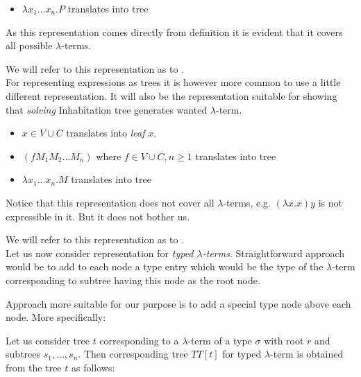 \documentclass[12pt,a4paper]{report}
\newcommand{\Lets}{Let us\xspace}
\newcommand{\lterm}{$\lambda$-term\xspace}
\newcommand{\lterms}{$\lambda$-terms\xspace}
\begin{document}
\begin{itemize}
	\item $\lambda x_1 \dots x_n . P$ translates into tree\\
\end{itemize}

As this representation comes directly from definition it is evident 
that it covers all possible \lterms.

We will refer to this representation as to \textit{\atTree}.\\
 

For representing expressions as trees it is however more common to use a little different
representation. It will also be the representation suitable for showing 
that \textit{solving} Inhabitation tree generates wanted \lterm.

\begin{itemize}
    \item $x \in V \cup C$ translates into \textit{leaf} $x$.
	\item $(f M_1 M_2 \dots M_n)$ where $f \in V \cup C, n \geq 1$ translates into tree\\
	\item $\lambda x_1 \dots x_n . M$ translates into tree\\
\end{itemize}

Notice that this representation does not cover all \lterms, 
e.g. $(\lambda x.x) y$ is not expressible in it. But it does not bother us. 

We will refer to this representation as to \textit{\sexprTree}.\\ 

\Lets now consider representation for \textit{typed \lterms}.
Straightforward approach would be to add to each node a type entry which 
would be the type of the \lterm corresponding to subtree having this
node as the root node. 

Approach more suitable for our purpose is to add a special type node above each node.
More specifically:

\Lets consider tree $t$ corresponding to a \lterm of a type
$\sigma$ with root $r$ and subtrees $s_1 , \dots , s_n$. 
Then corresponding tree $TT[t]$ for typed \lterm is 
obtained from the tree $t$ as follows:  
\end{document}
